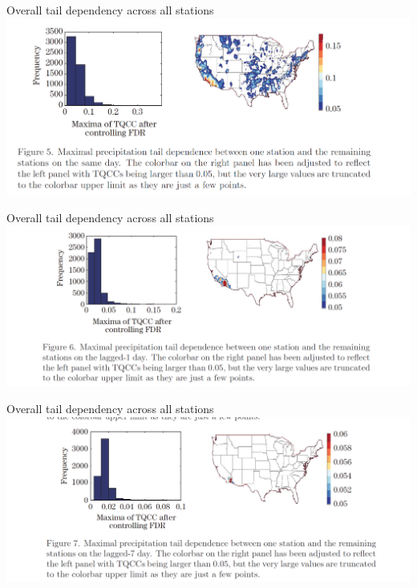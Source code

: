 \documentclass[12pt]{beamer}
\begin{document}
\begin{frame}{Overall tail dependency across all stations}
\includegraphics[scale=0.7]{figure3.png}
\end{frame}
\begin{frame}{Overall tail dependency across all stations}
\includegraphics[scale=0.7]{figure4.png}
\end{frame}
\begin{frame}{Overall tail dependency across all stations}
\includegraphics[scale=0.7]{figure5.png}
\end{frame}
\end{document}
